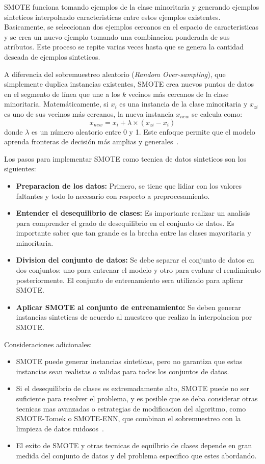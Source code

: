 \documentclass[12pt]{article}
\begin{document}
SMOTE funciona tomando ejemplos de la clase minoritaria y generando ejemplos sinteticos interpolando caracteristicas entre estos ejemplos existentes. Basicamente, se seleccionan dos ejemplos cercanos en el espacio de caracteristicas y se crea un nuevo ejemplo tomando una combinacion ponderada de sus atributos. Este proceso se repite varias veces hasta que se genera la cantidad deseada de ejemplos sinteticos.

A diferencia del sobremuestreo aleatorio (\textit{Random Over-sampling}), que simplemente duplica instancias existentes, SMOTE crea nuevos puntos de datos en el segmento de línea que une a los $k$ vecinos más cercanos de la clase minoritaria. Matemáticamente, si $x_i$ es una instancia de la clase minoritaria y $x_{zi}$ es uno de sus vecinos más cercanos, la nueva instancia $x_{new}$ se calcula como:
\begin{equation}
    x_{new} = x_i + \lambda \times (x_{zi} - x_i)
\end{equation}
donde $\lambda$ es un número aleatorio entre 0 y 1. Este enfoque permite que el modelo aprenda fronteras de decisión más amplias y generales~\cite{Chawla2002}.

Los pasos para implementar SMOTE como tecnica de datos sinteticos son los siguientes:
\begin{itemize}
    \item \textbf{Preparacion de los datos:} Primero, se tiene que lidiar con los valores faltantes y todo lo necesario con respecto a preprocesamiento.
    \item \textbf{Entender el desequilibrio de clases:} Es importante realizar un analisis para comprender el grado de desequilibrio en el conjunto de datos. Es importante saber que tan grande es la brecha entre las clases mayoritaria y minoritaria.
    \item \textbf{Division del conjunto de datos:} Se debe separar el conjunto de datos en dos conjuntos: uno para entrenar el modelo y otro para evaluar el rendimiento posteriormente. El conjunto de entrenamiento sera utilizado para aplicar SMOTE.
    \item \textbf{Aplicar SMOTE al conjunto de entrenamiento:} Se deben generar instancias sinteticas de acuerdo al muestreo que realizo la interpolacion por SMOTE.
\end{itemize}

Consideraciones adicionales: 
\begin{itemize}
    \item SMOTE puede generar instancias sinteticas, pero no garantiza que estas instancias sean realistas o validas para todos los conjuntos de datos. 
    \item Si el desequilibrio de clases es extremadamente alto, SMOTE puede no ser suficiente para resolver el problema, y es posible que se deba considerar otras tecnicas mas avanzadas o estrategias de modificacion del algoritmo, como SMOTE-Tomek o SMOTE-ENN, que combinan el sobremuestreo con la limpieza de datos ruidosos~\cite{Batista2004}.
    \item El exito de SMOTE y otras tecnicas de equilbrio de clases depende en gran medida del conjunto de datos y del problema especifico que estes abordando.
\end{itemize}
\end{document}
